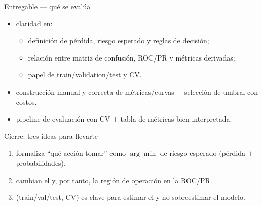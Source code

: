 \begin{frame}{Entregable — qué se evalúa}
\begin{itemize}
  \item {} claridad en:
  \begin{itemize}
    \item definición de pérdida, riesgo esperado y reglas de decisión;
    \item relación entre matriz de confusión, ROC/PR y métricas derivadas;
    \item papel de train/validation/test y CV.
  \end{itemize}
  \item {} construcción manual y correcta de métricas/curvas + selección de umbral con costos.
  \item {} pipeline de evaluación con CV + tabla de métricas bien interpretada.
\end{itemize}
\end{frame}

\begin{frame}{Cierre: tres ideas para llevarte}
\begin{enumerate}
  \item {} formaliza “qué acción tomar” como \(\arg\min\) de riesgo esperado (pérdida \(+\) probabilidades). \hfill {}
  \item {} cambian el  y, por tanto, la región de operación en la ROC/PR. \hfill {}
  \item {} (train/val/test, CV) es clave para estimar el  y no sobreestimar el modelo. \hfill {}
\end{enumerate}
\end{frame}

